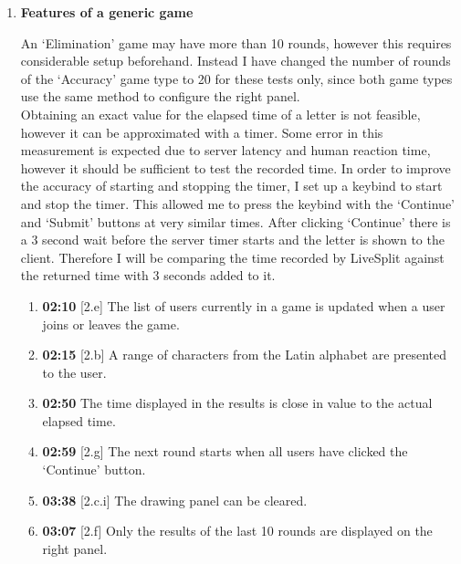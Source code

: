 \documentclass{article}
\begin{document}
\begin{enumerate}

    \item \textbf{Features of a generic game}

    An `Elimination' game may have more than 10 rounds, however this requires considerable setup beforehand. Instead I have changed the number of rounds of the `Accuracy' game type to 20 for these tests only, since both game types use the same method to configure the right panel. \\
    
    Obtaining an exact value for the elapsed time of a letter is not feasible, however it can be approximated with a timer. Some error in this measurement is expected due to server latency and human reaction time, however it should be sufficient to test the recorded time. In order to improve the accuracy of starting and stopping the timer, I set up a keybind to start and stop the timer. This allowed me to press the keybind with the `Continue' and `Submit' buttons at very similar times. After clicking `Continue' there is a 3 second wait before the server timer starts and the letter is shown to the client. Therefore I will be comparing the time recorded by LiveSplit against the returned time with 3 seconds added to it.
    
    \begin{enumerate}
        \item \textbf{02:10} [2.e] The list of users currently in a game is updated when a user joins or leaves the game.
        \item \textbf{02:15} [2.b] A range of characters from the Latin alphabet are presented to the user.
        \item \textbf{02:50} The time displayed in the results is close in value to the actual elapsed time.
        \item \textbf{02:59} [2.g] The next round starts when all users have clicked the `Continue' button.
        \item \textbf{03:38} [2.c.i] The drawing panel can be cleared.
        \item \textbf{03:07} [2.f] Only the results of the last 10 rounds are displayed on the right panel.
    \end{enumerate}


\end{enumerate}
\end{document}
